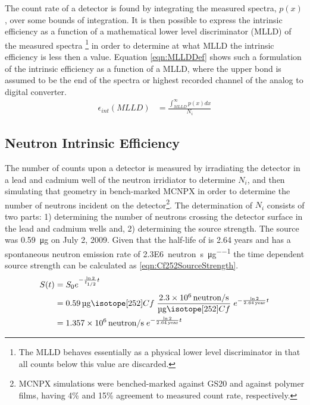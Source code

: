 The count rate of a detector is found by integrating the measured spectra, $p(x)$,  over some bounds of integration.
It is then possible to express the intrinsic efficiency as a function of a mathematical lower level discriminator (MLLD) of the measured spectra \footnote{The MLLD behaves essentially as a physical lower level discriminator in that all counts below this value are discarded.} in order to determine at what MLLD the intrinsic efficiency is less then a value.
Equation \eqref{eqn:MLLDDef} shows such a formulation of the intrinsic efficiency as a function of a MLLD, where the upper bond is assumed to be the end of the spectra or highest recorded channel of the analog to digital converter.
\begin{align}
	\label{eqn:MLLDDef}
	\epsilon_{int}(MLLD) &= \frac{\int_{MLLD}^\infty p(x)dx}{N_i}
\end{align}

\subsection{Neutron Intrinsic Efficiency}
The number of counts upon a detector is measured by irradiating the detector in a lead and cadmium well of the neutron irridiator to determine $N_i$, and then simulating that geometry in bench-marked MCNPX in order to determine the number of neutrons incident on the detector\footnote{MCNPX simulations were benched-marked against GS20 and against polymer films, having 4\% and 15\% agreement to measured count rate, respectively.}.
The determination of $N_i$ consists of two parts: 1) determining the number of neutrons crossing the detector surface in the lead and cadmium wells and, 2) determining the source strength.
The  source was \SI{0.59}{\ug} on July 2, 2009.
Given that the half-life of  is 2.64 years and  has a spontaneous neutron emission rate of \SI{2.3E6}{neutron\per\second\per\micro\gram} the time dependent source strength can be calculated as \eqref{eqn:Cf252SourceStrength}.
\begin{align}
  \label{eqn:Cf252SourceStrength}
  S(t) &= S_0 e^{-\frac{\ln{2}}{t_{1/2}} t} \\ \notag 
    &= \SI{0.59}{\ug} \iso[252]{Cf} \;\frac{\SI{2.3E6}{neutron\per\second}}{\si{\ug} \iso[252]{Cf}}\; e^{-\frac{ \ln{2}}{\SI{2.64}{year}}t}  \\ \notag
    &= \SI{1.357E6}{neutron\per\second}\; e^{-\frac{ \ln{2}}{\SI{2.64}{year}}t} 
\end{align}

